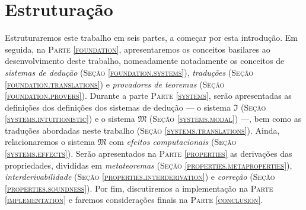     \section{Estruturação}
    Estruturaremos este trabalho em seis partes, a começar por esta introdução.
    Em seguida, na \textsc{Parte \ref{foundation}}, apresentaremos os conceitos basilares ao desenvolvimento deste trabalho, nomeadamente notadamente os conceitos de \emph{sistemas de dedução} (\textsc{Seção \ref{foundation.systems}}), \emph{traduções} (\textsc{Seção \ref{foundation.translations}}) e \emph{provadores de teoremas} (\textsc{Seção \ref{foundation.provers}}).
    Durante a parte \textsc{Parte \ref{systems}}, serão apresentadas as definições dos  definições dos sistemas de dedução --- o sistema $\mathfrak{I}$ (\textsc{Seção \ref{systems.intuitionistic}}) e o sistema $\mathfrak{M}$ (\textsc{Seção \ref{systems.modal}}) ---, bem como as traduções abordadas neste trabalho (\textsc{Seção \ref{systems.translations}}).
    Ainda, relacionaremos o sistema $\mathfrak{M}$ com \emph{efeitos computacionais} (\textsc{Seção \ref{systems.effects}}).
    Serão apresentados na \textsc{Parte \ref{properties}} as derivações das propriedades, divididas em \emph{metateoremas}  (\textsc{Seção \ref{properties.metaproperties}}), \emph{interderivabilidade}  (\textsc{Seção \ref{properties.interderivation}}) e \emph{correção}  (\textsc{Seção \ref{properties.soundness}}).
    Por fim, discutiremos a implementação na \textsc{Parte \ref{implementation}} e faremos considerações finais na \textsc{Parte \ref{conclusion}}.
